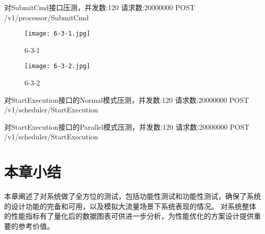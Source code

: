 对SubmitCmd接口压测，并发数:120 请求数:20000000
POST /v1/processor/SubmitCmd

\begin{figure}[H]
    \centering
    \texttt{[image: 6-3-1.jpg]}
    \caption{6-3-1}
    \label{fig:6-3-1}
\end{figure}

\begin{figure}[H]
    \centering
    \texttt{[image: 6-3-2.jpg]}
    \caption{6-3-2}
    \label{fig:6-3-2}
\end{figure}

对StartExecution接口的Normal模式压测，并发数:120 请求数:20000000
POST /v1/scheduler/StartExecution

对StartExecution接口的Parallel模式压测，并发数:120 请求数:20000000
POST /v1/scheduler/StartExecution


\section{本章小结}

本章阐述了对系统做了全方位的测试，包括功能性测试和功能性测试，确保了系统的设计功能的完备和可用，以及模拟大流量场景下系统表现的情况。
对系统整体的性能指标有了量化后的数据图表可供进一步分析，为性能优化的方案设计提供重要的参考价值。